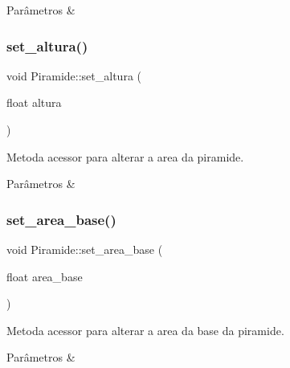 \begin{DoxyParams}{Parâmetros}
{\em } & \\
\hline
\end{DoxyParams}
\mbox{\label{classPiramide_a5a0b37acd4834fb528beeb985f385d6d}} 
\subsubsection{\texorpdfstring{set\+\_\+altura()}{set\_altura()}}
{\footnotesize\ttfamily void Piramide\+::set\+\_\+altura (\begin{DoxyParamCaption}\item[{float}]{altura }\end{DoxyParamCaption})}



Metoda acessor para alterar a area da piramide. 


\begin{DoxyParams}{Parâmetros}
{\em } & \\
\hline
\end{DoxyParams}
\mbox{\label{classPiramide_a3c29913c295f62f05813dc72baa3a36d}} 
\subsubsection{\texorpdfstring{set\+\_\+area\+\_\+base()}{set\_area\_base()}}
{\footnotesize\ttfamily void Piramide\+::set\+\_\+area\+\_\+base (\begin{DoxyParamCaption}\item[{float}]{area\+\_\+base }\end{DoxyParamCaption})}



Metoda acessor para alterar a area da base da piramide. 


\begin{DoxyParams}{Parâmetros}
{\em } & \\
\hline
\end{DoxyParams}
\mbox{\label{classPiramide_aad0af6674d79dffcf0c17f82bd9625ad}} 
